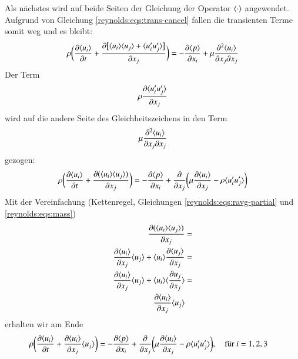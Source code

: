 %
Als nächstes wird auf beide Seiten der Gleichung der Operator $\ravg{\cdot}$ angewendet.
Aufgrund von Gleichung \eqref{reynolds:eqs:trans-cancel} fallen die transienten Terme somit
weg und es bleibt:
%
\begin{equation}
    \rho \biggl(
            \frac{\partial \ravg{u_i}}{\partial t} +
            \frac{\partial \bigl[ \ravg{u_i} \ravg{u_j} + \ravg{u_i' u_j'} \bigr]}{\partial x_j}
        \biggr) =
        - \frac{\partial \ravg{p}}{\partial x_i} + 
        \mu \frac{\partial^2 \ravg{u_i}}{\partial x_j \partial x_j}
\end{equation}
%
Der Term 
%
$$\rho \frac{\partial \ravg{u_i' u_j'}}{\partial x_j}$$
%
wird auf die andere Seite des Gleichheitszeichens in den Term 
%
$$\mu \frac{\partial^2 \ravg{u_i}}{\partial x_j \partial x_j}$$
%
gezogen:
%
\begin{equation}
    \rho \biggl(
            \frac{\partial \ravg{u_i}}{\partial t} +
            \frac{\partial ( \ravg{u_i} \ravg{u_j})}{\partial x_j}
        \biggr) =
        - \frac{\partial \ravg{p}}{\partial x_i} + 
            \frac{\partial}{\partial x_j} 
                \biggl(
                    \mu \frac{\partial \ravg{u_i}}{\partial x_j} - \rho \ravg{u_i' u_j'}
                \biggr)
\end{equation}
%
Mit der Vereinfachung (Kettenregel, Gleichungen \eqref{reynolds:eqs:ravg-partial} und \eqref{reynolds:eqs:mass})
%
\begin{align}
    \frac{\partial ( \ravg{u_i} \ravg{u_j})}{\partial x_j} &= \\
        \frac{\partial \ravg{u_i}}{\partial x_j} \ravg{u_j} +
    \ravg{u_i} \frac{\partial \ravg{u_j}}{\partial x_j} &= \\
        \frac{\partial \ravg{u_i}}{\partial x_j} \ravg{u_j} +
    \ravg{u_i} \ravg{\frac{\partial u_j}{\partial x_j}} &= \\
        \frac{\partial \ravg{u_i}}{\partial x_j} \ravg{u_j}
\end{align}
%
erhalten wir am Ende
%
\begin{align}
    \label{reynolds:eqs:rans}
    \rho \biggl(
            \frac{\partial \ravg{u_i}}{\partial t} +
            \frac{\partial \ravg{u_i}}{\partial x_j} \ravg{u_j}
        \biggr) &=
        - \frac{\partial \ravg{p}}{\partial x_i} + 
            \frac{\partial}{\partial x_j}
            \biggl(
                \mu \frac{\partial \ravg{u_i}}{\partial x_j} - \rho \ravg{u_i' u_j'}
            \biggr),\quad\text{für $i=1,2,3$}
\end{align}
